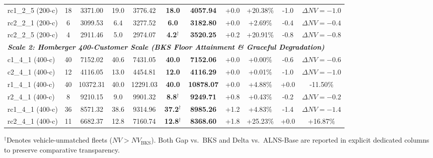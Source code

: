 \begin{table}[!t]
\begin{tabular*}{\textwidth}{@{\extracolsep{\fill}} l cc cc cc cc cc @{}}
rc1\_2\_5 (200-c) & 18 & 3371.00 & 19.0 & 3776.42 & \textbf{18.0} & \textbf{4057.94} & +0.0 & +20.38\% & -1.0 & $\Delta NV=-1.0$ \\
rc2\_2\_1 (200-c) & 6 & 3099.53 & 6.4 & 3277.52 & \textbf{6.0} & \textbf{3182.80} & +0.0 & +2.69\% & -0.4 & $\Delta NV=-0.4$ \\
rc2\_2\_5 (200-c) & 4 & 2911.46 & 5.0 & 2974.07 & \textbf{4.2}$^\dagger$ & \textbf{3520.25} & +0.2 & +20.91\% & -0.8 & $\Delta NV=-0.8$ \\
\midrule
\multicolumn{11}{l}{\textit{\textbf{Scale 2: Homberger 400-Customer Scale (BKS Floor Attainment \& Graceful Degradation)}}} \\
c1\_4\_1 (400-c) & 40 & 7152.02 & 40.6 & 7431.05 & \textbf{40.0} & \textbf{7152.06} & +0.0 & +0.00\% & -0.6 & $\Delta NV=-0.6$ \\
c2\_4\_1 (400-c) & 12 & 4116.05 & 13.0 & 4454.81 & \textbf{12.0} & \textbf{4116.29} & +0.0 & +0.01\% & -1.0 & $\Delta NV=-1.0$ \\
r1\_4\_1 (400-c) & 40 & 10372.31 & 40.0 & 12291.03 & \textbf{40.0} & \textbf{10878.07} & +0.0 & +4.88\% & +0.0 & -11.50\% \\
r2\_4\_1 (400-c) & 8 & 9210.15 & 9.0 & 9901.32 & \textbf{8.8}$^\dagger$ & \textbf{9249.71} & +0.8 & +0.43\% & -0.2 & $\Delta NV=-0.2$ \\
rc1\_4\_1 (400-c) & 36 & 8571.32 & 38.6 & 9314.96 & \textbf{37.2}$^\dagger$ & \textbf{8985.26} & +1.2 & +4.83\% & -1.4 & $\Delta NV=-1.4$ \\
rc2\_4\_1 (400-c) & 11 & 6682.37 & 12.8 & 7160.74 & \textbf{12.8}$^\dagger$ & \textbf{8368.60} & +1.8 & +25.23\% & +0.0 & +16.87\% \\
\bottomrule
\end{tabular*}
{\raggedright \footnotesize $^\dagger$Denotes vehicle-unmatched fleets ($NV > NV_{\text{BKS}}$). Both Gap vs.\ BKS and Delta vs.\ ALNS-Base are reported in explicit dedicated columns to preserve comparative transparency.\par}
\end{table}

